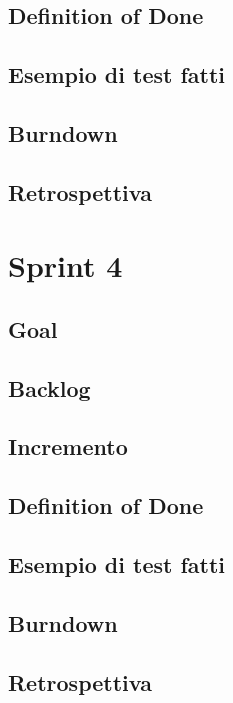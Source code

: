 \documentclass{article}
\begin{document}
\subsection{Definition of Done}

\subsection{Esempio di test fatti}

\subsection{Burndown}

\subsection{Retrospettiva}

\section{Sprint 4}

\subsection{Goal}

\subsection{Backlog}

\subsection{Incremento}

\subsection{Definition of Done}

\subsection{Esempio di test fatti}

\subsection{Burndown}

\subsection{Retrospettiva}
\end{document}
